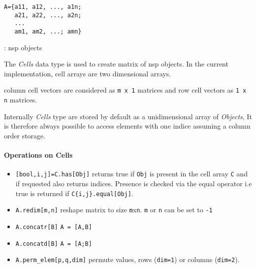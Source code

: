 
\begin{mandesc}
\end{mandesc}
\begin{calling_sequence}
\begin{verbatim}
A={a11, a12, ..., a1n;
   a21, a22, ..., a2n;
   ...
   am1, am2, ...; amn}
\end{verbatim}
\end{calling_sequence}
\begin{parameters}
  \begin{varlist}
    : nsp objects
  \end{varlist}
\end{parameters}

\begin{mandescription}

The \emph{Cells} data type is used to create matrix of nsp objects. 
In the current implementation, cell arrays are two dimensional arrays. 

column cell vectors are considered as \verb!m x 1! matrices and row cell vectors
as \verb!1 x n! matrices.

Internally \emph{Cells} type are stored by default as a unidimensional array of \emph{Objects},
It is therefore always possible to access elements with one indice assuming a column order 
storage. 
\end{mandescription}

\paragraph{Operations on Cells}
\begin{itemize}
\item \verb+[bool,i,j]=C.has[Obj]+ returns true if \verb+Obj+ is present in the cell array \verb+C+ and if requested also returns indices. Presence is checked via the equal operator i.e 
true is returned if \verb+C{i,j}.equal[Obj]+.
\end{itemize}
\begin{itemize}
\item \verb+A.redim[m,n]+ reshape matrix to size \verb+m+x\verb+n+. \verb+m+ or \verb+n+ can be set to \verb+-1+ 
\item \verb+A.concatr[B]+ \verb+A = [A,B]+
\item \verb+A.concatd[B]+ \verb+A = [A;B]+
\item \verb+A.perm_elem[p,q,dim]+ permute values, rows (\verb+dim=1+) or columns (\verb+dim=2+).
\end{itemize}

